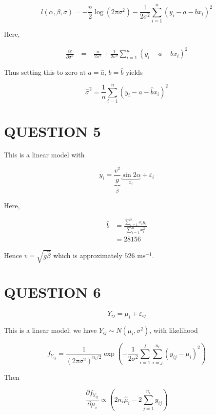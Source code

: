 \documentclass[a4paper]{article}
\begin{document}
\[ l(\alpha,\beta,\sigma) = - \frac{n}{2} \log(2 \pi \sigma^{2}) - \frac{1}{2 \sigma^{2}} \sum_{i=1}^{n} ( y_{i} - a - bx_{i})^{2}   \]

Here,

\begin{align*}
\frac{\partial l }{\partial \sigma^{2}} & = - \frac{n}{2 \sigma^{2}} + \frac{1}{2 \sigma^{2}} \sum_{i=1}^{n} ( y_{i} - a - bx_{i})^{2}
\end{align*}

Thus setting this to zero at $ a = \hat{a} $, $ b = \hat{b} $ yields

\[ \hat{\sigma}^{2} = \frac{1}{n} \sum_{i=1}^{n} ( y_{i} - \hat{a} - \hat{b} x_{i})^{2} \]



\section{QUESTION 5}

This is a linear model with 

\[ y_{i} = \underbrace{\frac{v^{2}}{g}}_{\hat{\beta}} \underbrace{\sin 2\alpha}_{x_{i}} + \varepsilon_{i} \]


Here,

\begin{align*}
\hat{b} & = \frac{\sum_{i=1}^{n} x_{i}y_{i} }{\sum_{i=1}^{n} x_{i}^{2} }\\
& = 28156
\end{align*}

Hence $ v = \sqrt{g \hat{\beta} } $ which is approximately $ 526 \text{ ms}^{-1} $.





\section{QUESTION 6}



\[ Y_{ij} = \mu_{i} + \varepsilon_{ij} \]

This is a linear model; we have $ Y_{ij} \sim N(\mu_{i}, \sigma^{2}) $, with likelihood

\[ f_{Y_{ij}} = \frac{1}{(2 \pi \sigma^{2})^{n_{i} /2}}  \exp \left(  - \frac{1}{2 \sigma^{2}} \sum_{i=1}^{I} \sum_{i=j}^{n_{i}} ( y_{ij} - \mu_{i} )^{2} \right)  \]

Then

\[ \frac{\partial f_{Y_{ij}} }{\partial \mu_{i}} \propto \left(  2n_{i} \hat{\mu}_{i} - 2 \sum_{j=1}^{n_{i}} y_{ij}  \right)   \]
\end{document}
